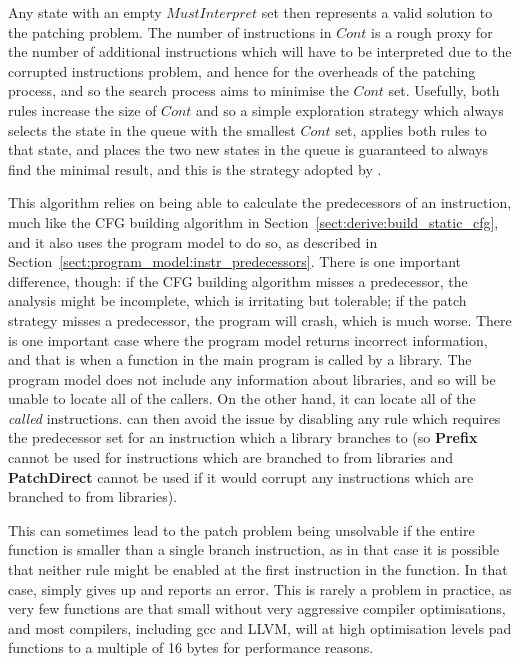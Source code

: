 Any state with an empty $\mathit{MustInterpret}$ set then represents a
valid solution to the patching problem.  The number of instructions in
$\mathit{Cont}$ is a rough proxy for the number of additional
instructions which will have to be interpreted due to the corrupted
instructions problem, and hence for the overheads of the patching
process, and so the search process aims to minimise the
$\mathit{Cont}$ set.  Usefully, both rules increase the size of
$\mathit{Cont}$ and so a simple exploration strategy which always
selects the state in the queue with the smallest $\mathit{Cont}$ set,
applies both rules to that state, and places the two new states in the
queue is guaranteed to always find the minimal result, and this is the
strategy adopted by {\implementation}.

This algorithm relies on being able to calculate the predecessors of
an instruction, much like the CFG building algorithm in
Section~\ref{sect:derive:build_static_cfg}, and it also uses the
program model to do so, as described in
Section~\ref{sect:program_model:instr_predecessors}.   There is one important difference, though: if
the CFG building algorithm misses a predecessor, the analysis might be
incomplete, which is irritating but tolerable; if the patch strategy
misses a predecessor, the program will crash, which is much worse.
There is one important case where the program model returns incorrect
information, and that is when a function in the main program is called
by a library.  The program model does not include any information
about libraries, and so will be unable to locate all of the callers.
On the other hand, it can locate all of the \emph{called}
instructions.  {\Technique} can then avoid the issue by disabling any
rule which requires the predecessor set for an instruction which a
library branches to (so \textbf{Prefix} cannot be used for
instructions which are branched to from libraries and
\textbf{PatchDirect} cannot be used if it would corrupt any
instructions which are branched to from libraries).

This can sometimes lead to the patch problem being unsolvable if the
entire function is smaller than a single branch instruction, as in
that case it is possible that neither rule might be enabled at the
first instruction in the function.  In that case, {\implementation}
simply gives up and reports an error.  This is rarely a problem in
practice, as very few functions are that small without very aggressive
compiler optimisations, and most compilers, including gcc and
LLVM\needCite{}, will at high optimisation levels pad functions to a
multiple of 16 bytes for performance reasons.

